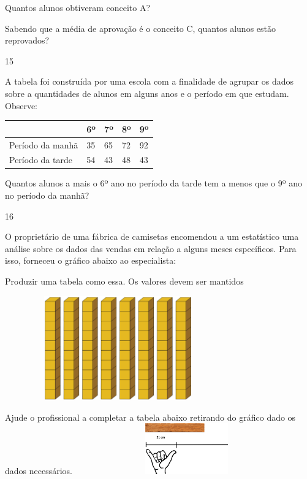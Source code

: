 \begin{escolha}
\begin{escolha}
\begin{escolha}
\item
  Quantos alunos obtiveram conceito A?

\item
  Sabendo que a média de aprovação é o conceito C, quantos alunos estão
  reprovados?
\end{escolha}

\num{15}

A tabela foi construída por uma escola com a finalidade de agrupar os
dados sobre a quantidades de alunos em alguns anos e o período em que
estudam. Observe:

\begin{longtable}[]{@{}lllll@{}}
\toprule
& 6º & 7º & 8º & 9º\tabularnewline
\midrule
\endhead
Período da manhã & 35 & 65 & 72 & 92\tabularnewline
Período da tarde & 54 & 43 & 48 & 43\tabularnewline
\bottomrule
\end{longtable}

Quantos alunos a mais o 6º ano no período da tarde tem a menos que o 9º
ano no período da manhã?


\num{16}

O proprietário de uma fábrica de camisetas encomendou a um estatístico
uma análise sobre os dados das vendas em relação a alguns meses
específicos. Para isso, forneceu o gráfico abaixo ao especialista:

Produzir uma tabela como essa. Os valores devem ser mantidos

\includegraphics[width=3.82692in,height=1.76423in]{media/image103.png}

\begin{escolha}

\item
  Ajude o profissional a completar a tabela abaixo retirando do gráfico
  dado os dados necessários.
\includegraphics[width=3.78846in,height=0.86073in]{media/image104.png}


\end{escolha}
\end{escolha}
\end{escolha}
